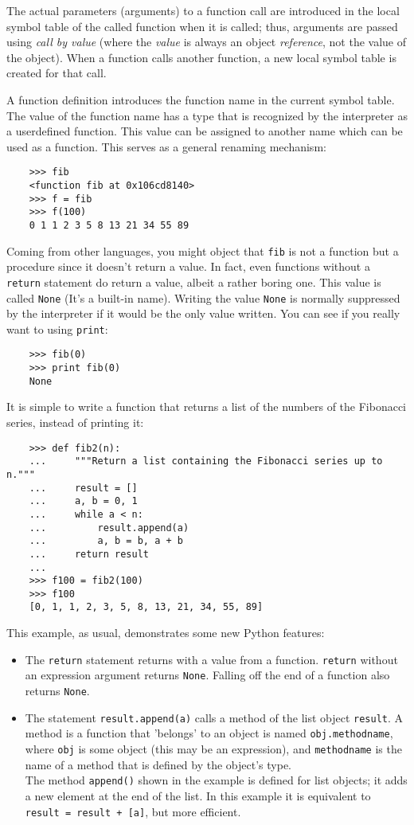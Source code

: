 \documentclass[UTF8]{article}
\begin{document}
The actual parameters (arguments) to a function call are introduced in the local symbol table of
the called function when it is called; thus, arguments are passed using \emph{call by value} (where
the \emph{value} is always an object \emph{reference}, not the value of the object). When a
function calls another function, a new local symbol table is created for that call.

A function definition introduces the function name in the current symbol table. The value of the
function name has a type that is recognized by the interpreter as a userdefined function. This
value can be assigned to another name which can be used as a function. This serves as a general
renaming mechanism:
\begin{verbatim}
    >>> fib
    <function fib at 0x106cd8140>
    >>> f = fib
    >>> f(100)
    0 1 1 2 3 5 8 13 21 34 55 89
\end{verbatim}

Coming from other languages, you might object that \texttt{fib} is not a function but a procedure
since it doesn't return a value. In fact, even functions without a \texttt{return} statement do
return a value, albeit a rather boring one. This value is called \texttt{None} (It's a built-in
name). Writing the value \texttt{None} is normally suppressed by the interpreter if it would be the
only value written. You can see if you really want to using \texttt{print}:
\begin{verbatim}
    >>> fib(0)
    >>> print fib(0)
    None
\end{verbatim}

It is simple to write a function that returns a list of the numbers of the Fibonacci series,
instead of printing it:
\begin{verbatim}
    >>> def fib2(n):
    ...     """Return a list containing the Fibonacci series up to n."""
    ...     result = []
    ...     a, b = 0, 1
    ...     while a < n:
    ...         result.append(a)
    ...         a, b = b, a + b
    ...     return result
    ...
    >>> f100 = fib2(100)
    >>> f100
    [0, 1, 1, 2, 3, 5, 8, 13, 21, 34, 55, 89]
\end{verbatim}
This example, as usual, demonstrates some new Python features:
\begin{itemize}
    \item The \texttt{return} statement returns with a value from a function. \texttt{return}
    without an expression argument returns \texttt{None}. Falling off the end of a function also
    returns \texttt{None}.
    \item The statement \texttt{result.append(a)} calls a method of the list object \texttt{result}.
    A method is a function that 'belongs' to an object is named \texttt{obj.methodname}, where
    \texttt{obj} is some object (this may be an expression), and \texttt{methodname} is the name of
    a method that is defined by the object's type. \\
    The method \texttt{append()} shown in the example is defined for list objects; it adds a new
    element at the end of the list. In this example it is equivalent to
    \texttt{result = result + [a]}, but more efficient.
\end{itemize}
\end{document}
